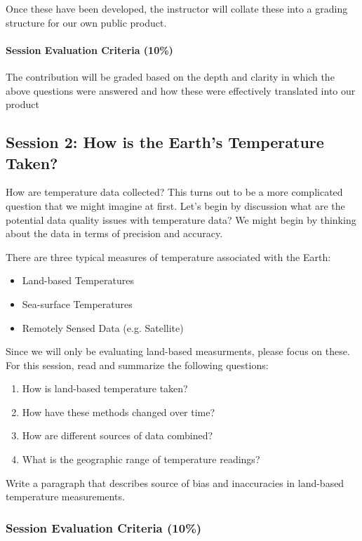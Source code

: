 \documentclass{article}\usepackage[]{graphicx}\usepackage[]{color}
\begin{document}
Once these have been developed, the instructor will collate these into a grading structure for our own public product. 

\paragraph{Session Evaluation Criteria (10\%)}

The contribution will be graded based on the depth and clarity in which the above questions were answered and how these were effectively translated into our product   

\subsection{Session 2: How is the Earth's Temperature Taken?}

How are temperature data collected? This turns out to be a more complicated question that we might imagine at first. Let's begin by discussion what are the potential data quality issues with temperature data? We might begin by thinking about the data in terms of precision and accuracy.

There are three typical measures of temperature associated with the Earth: 

\begin{itemize}
  \item Land-based Temperatures
  \item Sea-surface Temperatures
  \item Remotely Sensed Data (e.g. Satellite) 
\end{itemize}

Since we will only be evaluating land-based measurments, please focus on these. For this session, read and summarize the following questions:

\begin{enumerate}
  \item How is land-based temperature taken?
  \item How have these methods changed over time?
  \item How are different sources of data combined?
  \item What is the geographic range of temperature readings?
\end{enumerate}

Write a paragraph that describes source of bias and inaccuracies in land-based temperature measurements. 

\subsubsection{Session Evaluation Criteria (10\%)}
\end{document}
